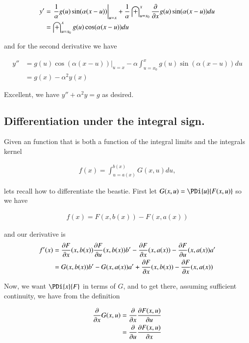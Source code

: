 \documentclass{article}
\begin{document}
\begin{align*}
y'
&=
{\left.
\frac{1}{\alpha}
g(u) \sin( \alpha(x-u) ) \right\vert}_{u=x}
+\frac{1}{\alpha} \int_{u=x_0}^x \PD{x}{} g(u) \sin( \alpha(x-u) ) du \\
&= \int_{u=x_0}^x g(u) \cos( \alpha(x-u) ) du \\
\end{align*}

and for the second derivative we have

\begin{align*}
y''
&=
{\left. g(u) \cos( \alpha(x-u) ) \right\vert}_{u=x}
- \alpha \int_{u=x_0}^x g(u) \sin( \alpha(x-u) ) du \\
&= g(x) - \alpha^2 y(x)
\end{align*}

Excellent, we have $y'' + \alpha^2 y = g$ as desired.

\subsection{ Differentiation under the integral sign. }

Given an function that is both a function of the integral limits and the integrals kernel

\begin{align*}
f(x) = \int_{u = a(x)}^{b(x)} G(x,u) du,
\end{align*}

lets recall how to differentiate the beastie.  First let $G(x,u) = \PDi{u}{F(x,u)}$ so we have

\begin{align*}
f(x) = F(x,b(x)) - F(x,a(x))
\end{align*}

and our derivative is
\begin{align*}
f'(x)
&=
\PD{x}{F}(x,b(x))
\PD{u}{F}(x,b(x)) b'
-\PD{x}{F}(x,a(x))
-\PD{u}{F}(x,a(x)) a' \\
&=
G(x,b(x)) b'
-G(x,a(x)) a'
+\PD{x}{F}(x,b(x))
-\PD{x}{F}(x,a(x))
\\
\end{align*}

Now, we want $\PDi{x}{F}$ in terms of $G$, and to get there, assuming sufficient continuity, we have from the definition

\begin{align*}
\PD{x}{} G(x,u) 
&= \PD{x}{} \PD{u}{F(x,u)} \\
&= \PD{u}{} \PD{x}{F(x,u)} \\
\end{align*}
\end{document}
